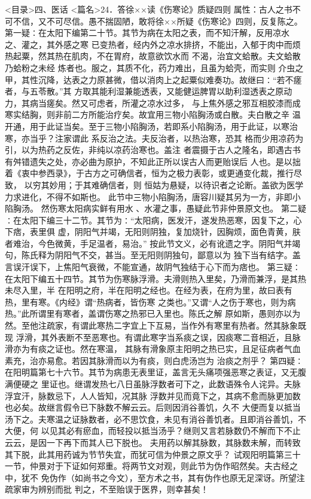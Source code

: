 \documentclass[a4paper,12pt,UTF8,twoside]{ctexbook}
\begin{document}
<目录>四、医话
<篇名>24．答徐××读《伤寒论》质疑四则
属性：古人之书不可不信，又不可尽信。愚不揣固陋，敢将徐××所疑《伤寒论》四则，反复陈之。 
第一疑∶在太阳下编第二十节。其节为病在太阳之表，而不知汗解，反用凉水 之、灌之，其外感之寒 
已变热者，经内外之凉水排挤，不能出，入郁于肉中而烦热起粟，然其热在肌肉，不在胃府，故意欲饮水而 
不渴，治宜文蛤散。夫文蛤散乃蛤粉之未经 炼者也。服之，其质不化，药力难出，且虽为蛤壳，而实则 
介虫之甲，其性沉降，达表之力原甚微，借以消肉上之起粟似难奏功。故继曰∶“若不瘥者，与五苓散。”其 
方取其能利湿兼能透表，又能健运脾胃以助利湿透表之原动力，其病当瘥矣。然又可虑者，所灌之凉水过多， 
与上焦外感之邪互相胶漆而成寒实结胸，则非前二方所能治疗矣。故宜用三物小陷胸汤或白散。夫白散之辛 
温开通，用于此证当矣。至于三物小陷胸汤，若即系小陷胸汤，用于此证，以寒治寒，亦当乎？注家谓此 
系反治之法。夫反治者，以热治寒，恐其 格而少用凉药为引，以为热药之反佐，非纯以凉药治寒也。盖注 
者震摄于古人之隆名，即遇古书有舛错遗失之处，亦必曲为原护，不知此正所以误古人而更贻误后 
人也。是以拙着《衷中参西录》，于古方之可确信者，恒为之极力表彰，或更通变化裁，推行尽致， 
以穷其妙用；于其难确信者，则 
恒姑为悬疑，以待识者之论断。盖欲为医学力求进化，不得不如斯也。 
此节中三物小陷胸汤，唐容川疑其另为一方，非即小陷胸汤。 
然伤寒太阳病实鲜有用水 、水灌之事，愚疑此节非仲景原文也。 
第二疑∶在太阳下编三十二节。其节为∶“太阳病，医发汗，遂发热恶寒，因复下之，心下痞，表里俱 
虚，阴阳气并竭，无阳则阴独，复加烧针，因胸烦，面色青黄，肤 者难治，今色微黄，手足温者，易治。” 
按此节文义，必有讹遗之字。阴阳气并竭句，陈氏释为阴阳气不交，甚当。至无阳则阴独句，鄙意以为 
独下当有结字。盖言误汗误下，上焦阳气衰微，不能宣通，故阴气独结于心下而为痞也。 
第三疑∶在太阳下编五十四节。其节为伤寒脉浮滑。夫滑则热入里矣，乃滑而兼浮，是其热未尽入里，半 
在阳明之府，半在阳明之经也。在经为表，在府为里，故曰表有热，里有寒。《内经》谓“热病者，皆伤寒 
之类也。”又谓“人之伤于寒也，则为病热。”此所谓里有寒者，盖谓伤寒之热邪已入里也。陈氏之解 
原如斯，愚则亦以为然。至他注疏家，有谓此寒热二字宜上下互易，当作外有寒里有热者。然其脉象既现 
浮滑，其外表断不至恶寒也。有谓此寒字当系痰之误，因痰寒二音相近，且脉滑亦为有痰之证也。然在寒温， 
其脉有滑象原主阳明之热已实，且足征病者气血素充，治亦易愈。若因其脉滑而以为有痰，则白虎汤岂为 
治痰之剂乎？ 
第四疑∶在阳明篇第七十六节。其节为病患无表里证，盖言无头痛项强恶寒之表证，又无腹满便硬之 
里证也。继谓发热七八日虽脉浮数者可下之，此数语殊令人诧异。夫脉浮宜汗，脉数忌下，人人皆知，况其脉 
浮数并见而竟下之，其病不愈而脉更加数也必矣。故继言假令已下脉数不解云云。后则因消谷善饥，久不 
大便而复以抵当汤下之。夫寒温之证脉数者，必不思饮食，未见有消谷善饥者。且即消谷善饥，不大便，何 
以见其必有瘀血，而轻投以抵当汤乎？继则又言若脉数仍不解而下不止云云，是因一下再下而其人已下脱也。 
夫用药以解其脉数，其脉数未解，而转致其下脱，此其用药诚为节节失宜，而犹可信为仲景之原文乎？ 
试观阳明篇第三十一节，仲景对于下证如何郑重。将两节文对观，则此节为伪作昭然矣。夫古经之中，犹不 
免伪作（如尚书之今文），至方术之书，其有伪作也原无足深讶。所望注疏家审为辨别而批 
判之，不至贻误于医界，则幸甚矣！ 
\end{document}
